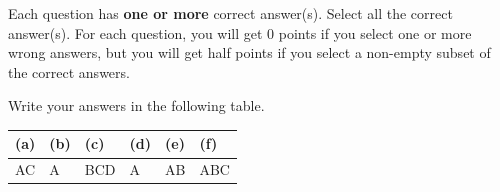 
Each question has \textbf{one or more} correct answer(s). Select all the correct answer(s). For each question, you will get 0 points if you select one or more wrong answers, but you will get half points if you select a non-empty subset of the correct answers.

Write your answers in the following table.


\begin{table}[h]
    \centering
    \renewcommand{\arraystretch}{1.25}
    \begin{tabular}{|p{2cm}|p{2cm}|p{2cm}|p{2cm}|p{2cm}|p{2cm}|}
        \hline 
        (a) & (b) & (c) & (d) & (e) & (f) \\
        \hline
        AC & A & BCD & A & AB & ABC \\

        \hline
    \end{tabular} 
\end{table}

